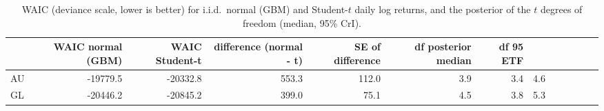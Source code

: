 \begin{table}
\caption{WAIC (deviance scale, lower is better) for i.i.d.\ normal (GBM) and Student-$t$ daily log returns, and the posterior of the $t$ degrees of freedom (median, 95\% CrI).}
\label{tab:waic}
\begin{tabular}{lrrrrrrr}
\toprule
 & WAIC normal (GBM) & WAIC Student-t & difference (normal - t) & SE of difference & df posterior median & df 95%
ETF &  &  &  &  &  &  &  \\
\midrule
AU & -19779.5 & -20332.8 & 553.3 & 112.0 & 3.9 & 3.4 & 4.6 \\
GL & -20446.2 & -20845.2 & 399.0 & 75.1 & 4.5 & 3.8 & 5.3 \\
\bottomrule
\end{tabular}
\end{table}
